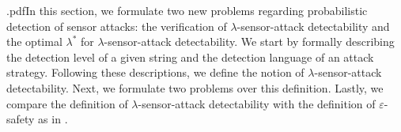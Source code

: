 .pdfIn this section, we formulate two new problems regarding probabilistic detection of sensor attacks: the verification of $\lambda$-sensor-attack detectability and the optimal $\lambda^*$ for $\lambda$-sensor-attack detectability.
We start by formally describing the detection level of a given string and the detection language of an attack strategy. 
Following these descriptions, we define the notion of $\lambda$-sensor-attack detectability.
Next, we formulate two problems over this definition.
Lastly, we compare the definition of $\lambda$-sensor-attack detectability with the definition of $\varepsilon$-safety as in \citep{meira-goes:2020towards,Fahim2024-wodes}.





